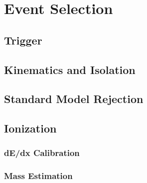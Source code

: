 \chapter{Event Selection}

\label{ch:selection}

\section{Trigger}


\section{Kinematics and Isolation}


\section{Standard Model Rejection}


\section{Ionization}

\subsection{dE/dx Calibration}

\subsection{Mass Estimation}

